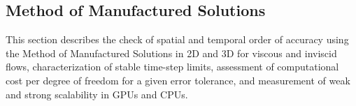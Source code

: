 \graphicspath{{figures_manufactured/}}%


\subsection{Method of Manufactured Solutions}

This section describes the check of spatial and temporal order of accuracy using the Method of Manufactured Solutions in 2D and 3D for viscous and inviscid flows, characterization of stable time-step limits, assessment of computational cost per degree of freedom for a given error tolerance, and measurement of weak and strong scalability in GPUs and CPUs.







